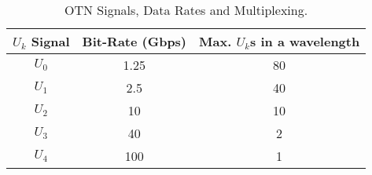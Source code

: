 \begin{table}[!t]
\renewcommand{\arraystretch}{1.1}
\caption{OTN Signals, Data Rates and Multiplexing.}
\label{tab:otn}
\centering
\begin{tabular}{c|c|c}
\hline
$U_{k}$ Signal &  Bit-Rate (Gbps) & Max. $U_{k}$s in a wavelength\\
\hline
$U_{0}$ & 1.25  & 80 \\
$U_{1}$ & 2.5  & 40 \\
$U_{2}$ & 10 & 10\\
$U_{3}$ & 40 & 2\\
$U_{4}$ & 100 & 1\\
\hline
\end{tabular}
\end{table}

